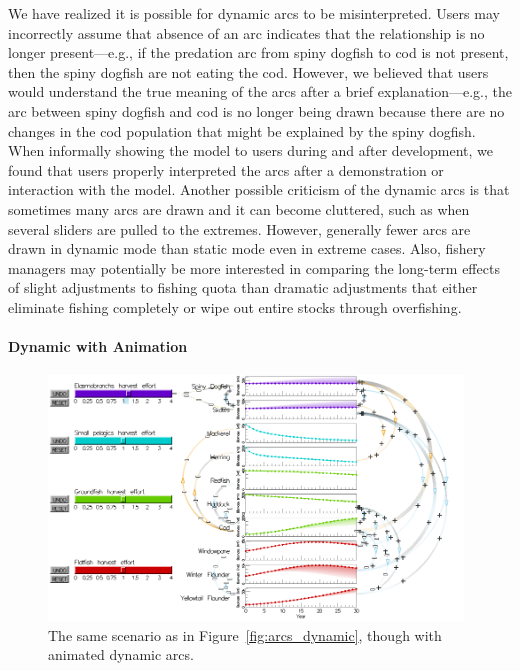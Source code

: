 We have realized it is possible for dynamic arcs to be misinterpreted.  Users may incorrectly assume that absence of an arc indicates that the relationship is no longer present---e.g., if the predation arc from spiny dogfish to cod is not present, then the spiny dogfish are not eating the cod.  However, we believed that users would understand the true meaning of the arcs after a brief explanation---e.g., the arc between spiny dogfish and cod is no longer being drawn because there are no changes in the cod population that might be explained by the spiny dogfish.  When informally showing the model to users during and after development, we found that users properly interpreted the arcs after a demonstration or interaction with the model.  Another possible criticism of the dynamic arcs is that sometimes many arcs are drawn and it can become cluttered, such as when several sliders are pulled to the extremes.  However, generally fewer arcs are drawn in dynamic mode than static mode even in extreme cases.  Also, fishery managers may potentially be more interested in comparing the long-term effects of slight adjustments to fishing quota than dramatic adjustments that either eliminate fishing completely or wipe out entire stocks through overfishing.

\paragraph{Dynamic with Animation} \label{sec:arcDynamicAnimated}

\begin{figure}[h]
	\centering
	\includegraphics[width=0.98\textwidth]{figures/png/arcs_dynamic_animated.png}
	\caption[The same scenario as in Figure~\ref{fig:arcs_dynamic}, though with animated dynamic arcs]{The same scenario as in Figure~\ref{fig:arcs_dynamic}, though with animated dynamic arcs.}
	\label{fig:arcs_dynamic_animated}
\end{figure}

